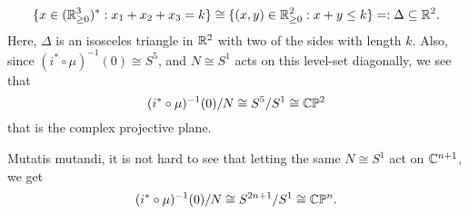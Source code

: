 \begin{ex}
	\begin{equation*}
	\{ x \in (\mathbb{R}_{\geq 0}^{3})^{\ast} : x_{1} + x_{2} + x_{3} = k \} \cong \{ (x,y) \in \mathbb{R}_{\geq 0}^{2} : x + y \leq k \} =: \Delta \subseteq \mathbb{R}^{2}.
	\end{equation*}
	Here, $\Delta$ is an isosceles triangle in $\mathbb{R}^{2}$ with two of the sides with length $k$. Also, since $(i^{\ast} \circ \mu)^{-1}(0) \cong S^{5}$, and $N\cong S^{1}$ acts on this level-set diagonally, we see that
	\begin{equation*}
	(i^{\ast} \circ \mu)^{-1}(0)/N \cong S^{5}/S^{1} \cong \mathbb{C}\mathbb{P}^{2}
	\end{equation*}
	that is the complex projective plane.
	
	Mutatis mutandi, it is not hard to see that letting the same $N \cong S^{1}$ act on $\mathbb{C}^{n+1}$, we get 
	\begin{equation*}
	(i^{\ast} \circ \mu)^{-1}(0)/N \cong S^{2n+1}/S^{1} \cong \mathbb{C}\mathbb{P}^{n}.
	\end{equation*}
\end{ex}

